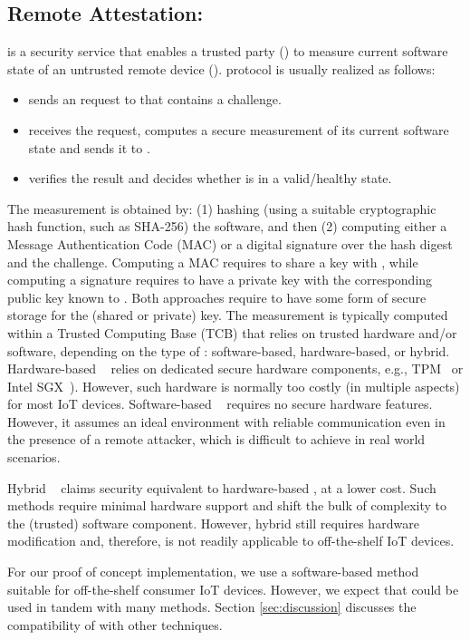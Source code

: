 \subsection{Remote Attestation: \ra}
%
\ra{} is a security service that enables a trusted party (\vrf) to measure current software state of an untrusted remote 
device (\prv). \ra protocol is usually realized as follows:
\begin{itemize}
    \item \vrf sends an \ra request to \prv that contains a challenge.
    \item \prv receives the request, computes a secure measurement of its current software state and sends it to \vrf.
    \item \vrf verifies the result and decides whether \prv is in a valid/healthy state.
\end{itemize}
%
The measurement is obtained by: (1) hashing (using a suitable cryptographic hash function, such as SHA-256) the software, and 
then (2) computing either a Message Authentication Code (MAC) or a digital signature over the hash digest and the challenge. 
Computing a MAC requires \prv to share a key with \vrf, while computing a signature requires \prv to have a 
private key with the corresponding public key known to \vrf. Both approaches require \prv to have some form of secure storage 
for the (shared or private) key. The measurement is typically computed 
within a Trusted Computing Base (TCB) that relies on trusted hardware and/or software, depending on the type of \ra: software-based,
hardware-based, or hybrid. 
Hardware-based \ra~\cite{tpm,sancus,kil2009remote,MQY10} relies on dedicated secure
hardware components, e.g., TPM~\cite{tpm} or Intel SGX~\cite{sgx}). 
However, such hardware is normally too costly (in multiple aspects) for most IoT devices.
Software-based \ra~\cite{KeJa03,seshadri2004swatt,ammar2020simple,grisafi2022pistis,gligor} requires no secure 
hardware features. However, it assumes an ideal environment with reliable communication even in the presence of a remote attacker, which is difficult to achieve in real world scenarios.

Hybrid \ra~\cite{smart,vrasedp,tytan,trustlite} claims security equivalent to hardware-based \ra, at a lower cost. Such methods require minimal hardware support and shift the bulk of complexity to the (trusted) software component. However, hybrid \ra still requires hardware modification and, therefore, is not readily applicable to off-the-shelf IoT devices.

For our proof of concept implementation, we use a software-based \ra{} method suitable for off-the-shelf consumer IoT devices.  
However, we expect that \system{} could be used in tandem with many \ra{} methods. Section \ref{sec:discussion} discusses the compatibility of \system with other \ra{} techniques.

